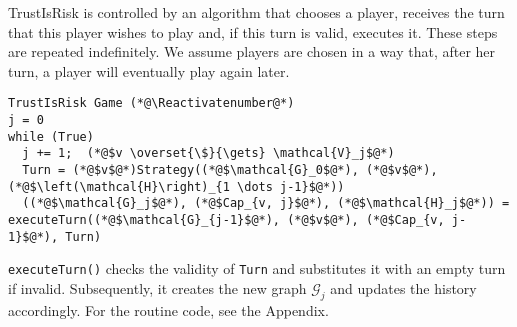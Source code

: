 \documentclass[11pt]{llncs}
\makeatletter
\newcommand*\Suppressnumber{%
  \lst@AddToHook{OnNewLine}{%
    \let\thelstnumber\relax%
     \advance\c@lstnumber-\@ne\relax%
    }%
}
\theoremstyle{definition}
\makeatother
\begin{document}
     TrustIsRisk is controlled by an algorithm that chooses a player, receives the turn that
     this player wishes to play and, if this turn is valid, executes it. These steps are repeated indefinitely. We assume
     players are chosen in a way that, after her turn, a player will eventually play again later.
     \Suppressnumber
     \begin{lstlisting}[label=trustisriskgame, style=numbers]
TrustIsRisk Game (*@\Reactivatenumber@*)
j = 0
while (True)
  j += 1;  (*@$v \overset{\$}{\gets} \mathcal{V}_j$@*)
  Turn = (*@$v$@*)Strategy((*@$\mathcal{G}_0$@*), (*@$v$@*), (*@$\left(\mathcal{H}\right)_{1 \dots j-1}$@*))
  ((*@$\mathcal{G}_j$@*), (*@$Cap_{v, j}$@*), (*@$\mathcal{H}_j$@*)) = executeTurn((*@$\mathcal{G}_{j-1}$@*), (*@$v$@*), (*@$Cap_{v, j-1}$@*), Turn)
    \end{lstlisting}
     \texttt{executeTurn()} checks the validity of \texttt{Turn} and substitutes it with an empty turn if invalid.
     Subsequently, it creates the new graph $\mathcal{G}_j$ and updates the history accordingly. For the routine code,
     see the Appendix.
\end{document}
